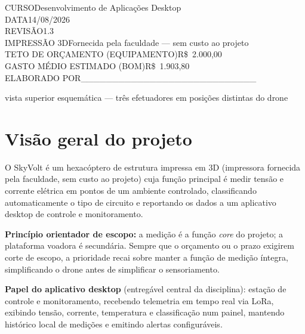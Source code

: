 \documentclass[11pt,a4paper]{article}
\newcommand{\specline}[2]{{\ttfamily\footnotesize\color{voltcyanlight}#1}\hfill{\normalsize\color{white}#2}\\[0.4em]}
\newcommand{\destaque}[2]{%
  \par\noindent\colorbox{voltbandbg}{%
    \begin{minipage}{\dimexpr\linewidth-2\fboxsep\relax}
      \vspace{0.3em}
      \textcolor{voltcyan}{\textbf{#1}} #2
      \vspace{0.3em}
    \end{minipage}%
  }\par\vspace{1em}
}
\begin{document}
\begin{titlepage}
\begin{center}
\vspace{1.3cm}

\begin{minipage}{10.6cm}
\specline{CURSO}{Desenvolvimento de Aplicações Desktop}
\specline{DATA}{14/08/2026}
\specline{REVISÃO}{1.3}
\specline{IMPRESSÃO 3D}{Fornecida pela faculdade — sem custo ao projeto}
\specline{TETO DE ORÇAMENTO (EQUIPAMENTO)}{R\$~2.000,00}
\specline{GASTO MÉDIO ESTIMADO (BOM)}{R\$~1.903,80}
\specline{ELABORADO POR}{\_\_\_\_\_\_\_\_\_\_\_\_\_\_\_\_\_\_\_\_\_\_\_\_\_\_\_\_}
\end{minipage}

\vfill
{\ttfamily\tiny\color{voltcyanlight!70!white} vista superior esquemática — três efetuadores em posições distintas do drone}
\vspace{0.4cm}
\end{center}
\end{titlepage}

\pagecolor{white}
\color{black}

\thispagestyle{empty}
\tableofcontents
\newpage

\section{Visão geral do projeto}

O SkyVolt é um hexacóptero de estrutura impressa em 3D (impressora fornecida pela faculdade, sem custo ao projeto) cuja função principal é medir tensão e corrente elétrica em pontos de um ambiente controlado, classificando automaticamente o tipo de circuito e reportando os dados a um aplicativo desktop de controle e monitoramento.

\destaque{Princípio orientador de escopo:}{a medição é a função \emph{core} do projeto; a plataforma voadora é secundária. Sempre que o orçamento ou o prazo exigirem corte de escopo, a prioridade recai sobre manter a função de medição íntegra, simplificando o drone antes de simplificar o sensoriamento.}

\textbf{Papel do aplicativo desktop} (entregável central da disciplina): estação de controle e monitoramento, recebendo telemetria em tempo real via LoRa, exibindo tensão, corrente, temperatura e classificação num painel, mantendo histórico local de medições e emitindo alertas configuráveis.
\end{document}
